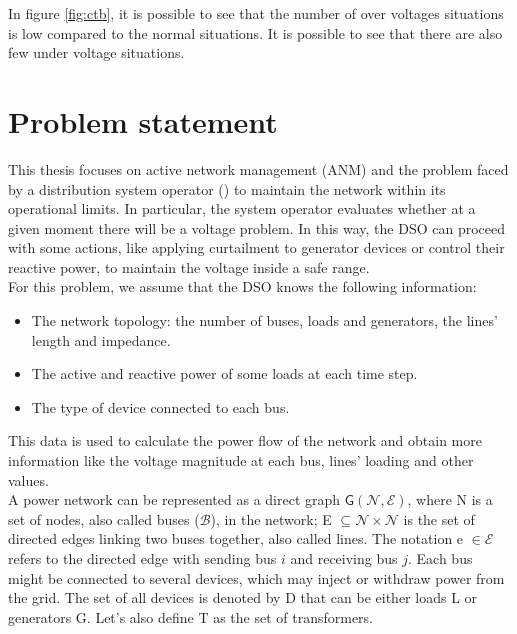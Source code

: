 In figure \ref{fig:ctb}, it is possible to see that the number of over voltages situations is low compared to the normal situations. It is possible to see that there are also few under voltage situations.



\section{Problem statement}
\label{sec:4ps}
This thesis focuses on active network management (ANM) and the problem faced by a distribution system operator () to maintain the network within its operational limits. In particular, the system operator evaluates whether at a given moment there will be a voltage problem. In this way, the \gls{DSO} can proceed with some actions, like applying curtailment to generator devices or control their reactive power, to maintain the voltage inside a safe range.\\

For this problem, we assume that the \gls{DSO} knows the following information:
\begin{itemize}
    \item The network topology: the number of buses, loads and generators, the lines' length and impedance.
    
    \item The active and reactive power of some loads at each time step.
    
    \item The type of  device connected to each bus.
\end{itemize}

This data is used to calculate the power flow of the network and obtain more information like the voltage magnitude at each bus, lines' loading and other values.\\

A power network can be represented as a direct graph $\mathsf{G}(\mathcal{N},\mathcal{E})$, where \gls{N} is a set of nodes, also called buses ($\mathcal{B}$), in the network; \gls{E} $\subseteq \mathcal{N} \times \mathcal{N}$ is the set of directed edges linking two buses together, also called lines. The notation \gls{e} $\in \mathcal{E}$ refers to the directed edge with sending bus $i$ and receiving bus $j$. Each bus might be connected to several devices, which may inject or withdraw power from the grid. The set of all devices is denoted by \gls{D} that can be either loads \gls{L} or generators \gls{G}. Let's also define \gls{T} as the set of transformers. \\

